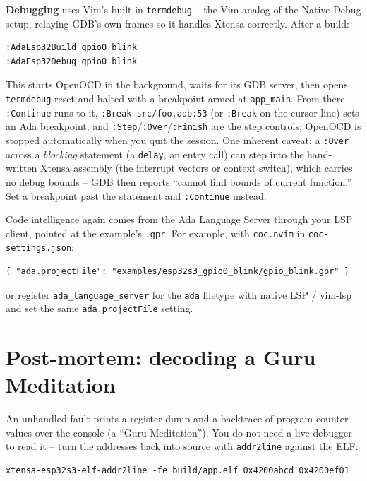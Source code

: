 \textbf{Debugging} uses Vim's built-in \texttt{termdebug} -- the Vim analog of
the Native Debug setup, relaying GDB's own frames so it handles Xtensa correctly.
After a build:

\begin{lstlisting}[style=sh]
:AdaEsp32Build gpio0_blink
:AdaEsp32Debug gpio0_blink
\end{lstlisting}

This starts OpenOCD in the background, waits for its GDB server, then opens
\texttt{termdebug} reset and halted with a breakpoint armed at \texttt{app\_main}.
From there \texttt{:Continue} runs to it, \texttt{:Break src/foo.adb:53} (or
\texttt{:Break} on the cursor line) sets an Ada breakpoint, and
\texttt{:Step}/\texttt{:Over}/\texttt{:Finish} are the step controls; OpenOCD is
stopped automatically when you quit the session. One inherent caveat: a
\texttt{:Over} across a \emph{blocking} statement (a \texttt{delay}, an entry
call) can step into the hand-written Xtensa assembly (the interrupt vectors or
context switch), which carries no debug bounds -- GDB then reports ``cannot find
bounds of current function.'' Set a breakpoint past the statement and
\texttt{:Continue} instead.

Code intelligence again comes from the Ada Language Server through your LSP
client, pointed at the example's \texttt{.gpr}. For example, with
\texttt{coc.nvim} in \texttt{coc-settings.json}:

\begin{lstlisting}[style=sh]
{ "ada.projectFile": "examples/esp32s3_gpio0_blink/gpio_blink.gpr" }
\end{lstlisting}

or register \texttt{ada\_language\_server} for the \texttt{ada} filetype with
native LSP / vim-lsp and set the same \texttt{ada.projectFile} setting.

\section{Post-mortem: decoding a Guru Meditation}

An unhandled fault prints a register dump and a backtrace of program-counter
values over the console (a ``Guru Meditation''). You do not need a live debugger
to read it -- turn the addresses back into source with \texttt{addr2line} against
the ELF:

\begin{lstlisting}[style=sh]
xtensa-esp32s3-elf-addr2line -fe build/app.elf 0x4200abcd 0x4200ef01
\end{lstlisting}

